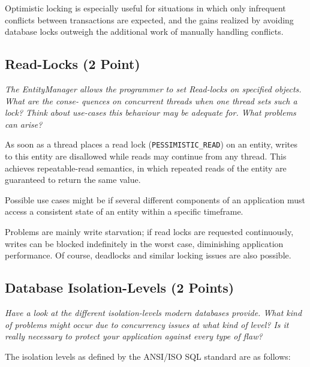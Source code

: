 \documentclass[a4paper,10pt]{article}
\begin{document}
Optimistic locking is especially useful for situations in which only infrequent
conflicts between transactions are expected, and the gains realized by avoiding
database locks outweigh the additional work of manually handling conflicts.

\subsection{Read-Locks (2 Point)}

\emph{The EntityManager allows the programmer to set Read-locks on specified objects. What are the conse-
quences on concurrent threads when one thread sets such a lock? Think about use-cases this behaviour
may be adequate for. What problems can arise?}

\vspace{3mm}

As soon as a thread places a read lock (\lstinline|PESSIMISTIC_READ|) on an entity,
writes to this entity are disallowed while reads may continue from any thread. This
achieves repeatable-read semantics, in which repeated reads of the entity are guaranteed to return the same
value.

Possible use cases might be if several different components of an application must
access a consistent state of an entity within a specific timeframe.

Problems are mainly write starvation; if read locks are requested continuously,
writes can be blocked indefinitely in the worst case, diminishing application performance.
Of course, deadlocks and similar locking issues are also possible.

\subsection{Database Isolation-Levels (2 Points)}

\emph{Have a look at the different isolation-levels modern databases provide. What kind of problems might
occur due to concurrency issues at what kind of level? Is it really necessary to protect your application
against every type of flaw?}

\vspace{3mm}

The isolation levels as defined by the ANSI/ISO SQL standard are as follows:
\end{document}
